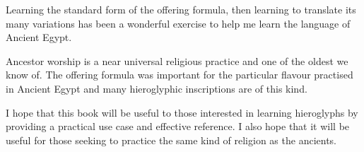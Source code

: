 Learning the standard form of the offering formula, then learning to translate its many variations has been a wonderful exercise to help me learn the language of Ancient Egypt.

Ancestor worship is a near universal religious practice and one of the oldest we know of. The offering formula was important for the particular flavour practised in Ancient Egypt and many hieroglyphic inscriptions are of this kind.

I hope that this book will be useful to those interested in learning hieroglyphs by providing a practical use case and effective reference. I also hope that it will be useful for those seeking to practice the same kind of religion as the ancients.
